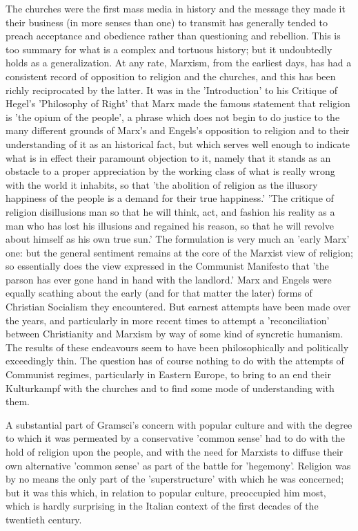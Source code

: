The churches were the first mass media in history and the message they made it their business (in more senses than one) to transmit has generally tended to preach acceptance and obedience rather than questioning and rebellion. This is too summary for what is a complex and tortuous history; but it undoubtedly holds as a generalization. At any rate, Marxism, from the earliest days, has had a consistent record of opposition to religion and the churches, and this has been richly reciprocated by the latter. It was in the 'Introduction' to his Critique of Hegel's 'Philosophy of Right' that Marx made the famous statement that religion is 'the opium of the people', a phrase which does not begin to do justice to the many different grounds of Marx's and Engels's opposition to religion and to their understanding of it as an historical fact, but which serves well enough to indicate what is in effect their paramount objection to it, namely that it stands as an obstacle to a proper appreciation by the working class of what is really wrong with the world it inhabits, so that 'the abolition of religion as the illusory happiness of the people is a demand for their true happiness.' 'The critique of religion disillusions man so that he will think, act, and fashion his reality as a man who has lost his illusions and regained his reason, so that he will revolve about himself as his own true sun.' The formulation is very much an 'early Marx' one: but the general sentiment remains at the core of the Marxist view of religion; so essentially does the view expressed in the Communist Manifesto that 'the parson has ever gone hand in hand with the landlord.' Marx and Engels were equally scathing about the early (and for that matter the later) forms of Christian Socialism they encountered. But earnest attempts have been made over the years, and particularly in more recent times to attempt a 'reconciliation' between Christianity and Marxism by way of some kind of syncretic humanism. The results of these endeavours seem to have been philosophically and politically exceedingly thin. The question has of course nothing to do with the attempts of Communist regimes, particularly in Eastern Europe, to bring to an end their Kulturkampf with the churches and to find some mode of understanding with them.

A substantial part of Gramsci's concern with popular culture and with the degree to which it was permeated by a conservative 'common sense' had to do with the hold of religion upon the people, and with the need for Marxists to diffuse their own alternative 'common sense' as part of the battle for 'hegemony'. Religion was by no means the only part of the 'superstructure' with which he was concerned; but it was this which, in relation to popular culture, preoccupied him most, which is hardly surprising in the Italian context of the first decades of the twentieth century.

